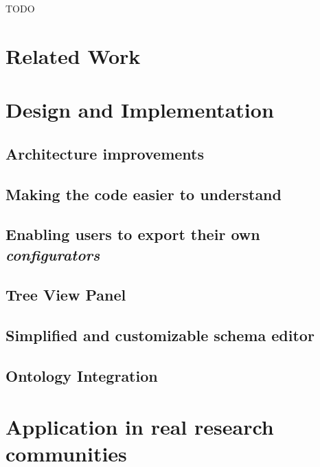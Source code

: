 \documentclass[lettersize,journal]{IEEEtran}
\begin{document}
TODO

 \section{Related Work}\label{sec:research}
 


 \section{Design and Implementation}\label{sec:design_and_implementation}
 

 \subsection{Architecture improvements}\label{subsec:architecture_rework}
 
 
 \subsection{Making the code easier to understand}\label{subsec:maintainability}
 
 
 
 \subsection{Enabling users to export their own \textit{configurators}}\label{subsec:custom_configurator}
 
 
 
 \subsection{Tree View Panel}\label{subsec:custom_configurator}
 
 
 
 \subsection{Simplified and customizable schema editor}\label{subsec:better_schema_editor}
 



 \subsection{Ontology Integration}\label{subsec:ontology_integration}
 


 \section{Application in real research communities}\label{sec:application}
 
\end{document}
